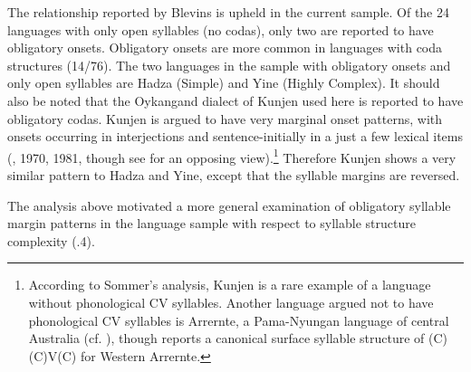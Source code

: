   The relationship reported by Blevins is upheld in the current sample. Of the 24 languages with only open syllables (no codas), only two are reported to have obligatory onsets. Obligatory onsets are more common in languages with coda structures (14/76). The two languages in the sample with obligatory onsets and only open syllables are Hadza (Simple) and Yine (Highly Complex). It should also be noted that the Oykangand dialect of Kunjen used here is reported to have obligatory codas. Kunjen is argued to have very marginal onset patterns, with onsets occurring in interjections and sentence-initially in a just a few lexical items (\citealt{Sommer1969}, 1970, 1981, though see \citealt{Dixon1970} for an opposing view).\footnote{ \textrm{According to Sommer’s analysis, Kunjen is a rare example of a language without phonological CV syllables. Another language argued not to have phonological CV syllables is Arrernte, a Pama-Nyungan language of central Australia (cf. \citealt{BreenPensalfini1999}), though \citet{Anderson2000} reports a canonical surface syllable structure of (C)(C)V(C) for Western Arrernte.}} Therefore Kunjen shows a very similar pattern to Hadza and Yine, except that the syllable margins are reversed.



  The analysis above motivated a more general examination of obligatory syllable margin patterns in the language sample with respect to syllable structure complexity (.4).






